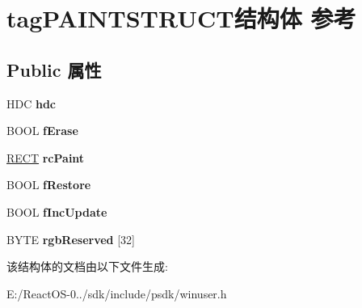 \hypertarget{structtag_p_a_i_n_t_s_t_r_u_c_t}{}\section{tag\+P\+A\+I\+N\+T\+S\+T\+R\+U\+C\+T结构体 参考}
\label{structtag_p_a_i_n_t_s_t_r_u_c_t}
\subsection*{Public 属性}
\begin{DoxyCompactItemize}
\item 
\mbox{\label{structtag_p_a_i_n_t_s_t_r_u_c_t_a39c0881e7f4245488a7f52e9f9e60367}} 
H\+DC {\bfseries hdc}
\item 
\mbox{\label{structtag_p_a_i_n_t_s_t_r_u_c_t_a51d9cec9d190b961523b3c9936583f2f}} 
B\+O\+OL {\bfseries f\+Erase}
\item 
\mbox{\label{structtag_p_a_i_n_t_s_t_r_u_c_t_a014c7522aaae2f238b7a8269b4c7b59e}} 
\hyperlink{structtag_r_e_c_t}{R\+E\+CT} {\bfseries rc\+Paint}
\item 
\mbox{\label{structtag_p_a_i_n_t_s_t_r_u_c_t_af6e2f3034d8a13ffd6e3bdfffb1aa6ff}} 
B\+O\+OL {\bfseries f\+Restore}
\item 
\mbox{\label{structtag_p_a_i_n_t_s_t_r_u_c_t_a027011f146fd4b4c8026a8bf9fa83fe0}} 
B\+O\+OL {\bfseries f\+Inc\+Update}
\item 
\mbox{\label{structtag_p_a_i_n_t_s_t_r_u_c_t_af43f290c4e97d35c82eb844db5928e95}} 
B\+Y\+TE {\bfseries rgb\+Reserved} \mbox{[}32\mbox{]}
\end{DoxyCompactItemize}


该结构体的文档由以下文件生成\+:\begin{DoxyCompactItemize}
\item 
E\+:/\+React\+O\+S-\/0../sdk/include/psdk/winuser.\+h\end{DoxyCompactItemize}
